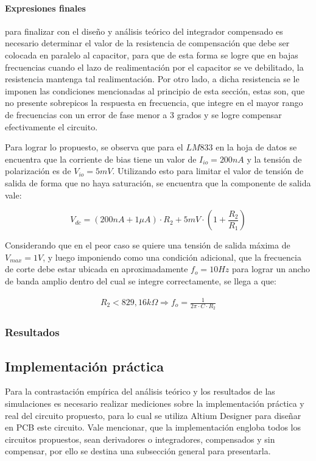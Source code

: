 \paragraph*{Expresiones finales} para finalizar con el dise\~no y an\'alisis te\'orico del integrador compensado es necesario determinar el valor de la resistencia de compensaci\'on que debe ser colocada en paralelo
al capacitor, para que de esta forma se logre que en bajas frecuencias cuando el lazo de realimentaci\'on por el capacitor se ve debilitado, la resistencia mantenga tal realimentaci\'on. Por otro lado, a dicha resistencia se le imponen
las condiciones mencionadas al principio de esta secci\'on, estas son, que no presente sobrepicos la respuesta en frecuencia, que integre en el mayor rango de frecuencias con un error de fase menor a 3 grados y se logre compensar
efectivamente el circuito.

Para lograr lo propuesto, se observa que para el $LM833$ en la hoja de datos se encuentra que la corriente de bias tiene un valor de $I_{io} = 200nA$ y la tensi\'on de polarizaci\'on es de
$V_{io} = 5mV$. Utilizando esto para limitar el valor de tensi\'on de salida de forma que no haya saturaci\'on, se encuentra que la componente de salida vale:

\begin{equation*}
	V_{dc} = (200nA + 1\mu A) \cdot R_2 + 5mV \cdot ( 1 + \frac{R_2}{R_1} )
\end{equation*}

Considerando que en el peor caso se quiere una tensi\'on de salida m\'axima de $V_{max} = 1V$, y luego imponiendo como una condici\'on adicional, que la frecuencia de corte
debe estar ubicada en aproximadamente $f_o = 10Hz$ para lograr un ancho de banda amplio dentro del cual se integre correctamente, se llega a que:

\begin{align*}
	R_2 < 829,16 k \Omega 
	\Rightarrow
	f_o = \frac{1}{2 \pi \cdot C \cdot R_2}
\end{align*}

\subsubsection{Resultados}

\subsection{Implementaci\'on pr\'actica}
Para la contrastaci\'on emp\'irica del an\'alisis te\'orico y los resultados de las simulaciones es necesario realizar mediciones sobre
la implementaci\'on pr\'actica y real del circuito propuesto, para lo cual se utiliza Altium Designer para diseñar en PCB este circuito.
Vale mencionar, que la implementaci\'on engloba todos los circuitos propuestos, sean derivadores o integradores, compensados y sin compensar, por ello
se destina una subsecci\'on general para presentarla.

